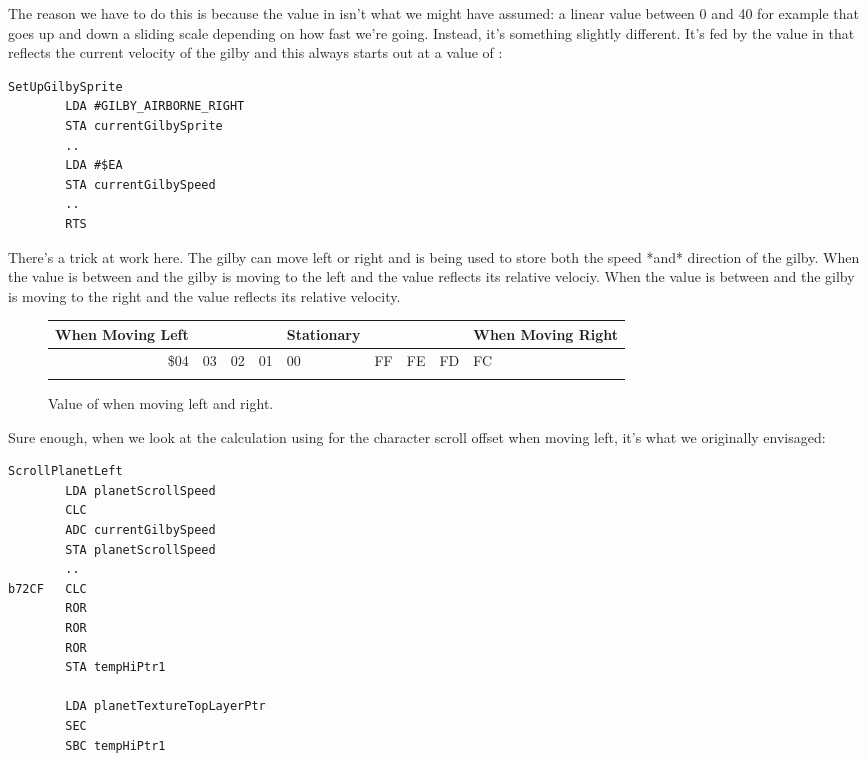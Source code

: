 The reason we have to do this is because the value in  isn't what we might have
assumed: a linear value between 0 and 40 for example that goes up and down a sliding scale depending on
how fast we're going. Instead, it's something slightly different. It's fed by the value in 
that reflects the current velocity of the gilby and this always starts out at a value of :

\begin{lstlisting}
SetUpGilbySprite
        LDA #GILBY_AIRBORNE_RIGHT
        STA currentGilbySprite
        ..
        LDA #$EA
        STA currentGilbySpeed
        ..
        RTS
\end{lstlisting}

There's a trick at work here. The gilby can move left or right and  is being used to
store both the speed *and* direction of the gilby. When the value is between  and  the gilby is moving
to the left and the value reflects its relative velociy. When the value is between  and  the gilby is
moving to the right and the value reflects its relative velocity.


\begin{figure}[H]
  {
    \setlength{\tabcolsep}{3.0pt}
    \setlength\cmidrulewidth{\heavyrulewidth} %
    \begin{adjustbox}{width=6cm,center}

      \begin{tabular}{rllllllll}
        \toprule
        When Moving Left &  & & & Stationary &  & & & When Moving Right    \\
        \midrule
        \$04 & 03 & 02 & 01 & 00 & FF & FE & FD & FC \\
        \addlinespace
        \bottomrule
      \end{tabular}
    \end{adjustbox}
  }\caption{Value of  when moving left and right.}
\end{figure}

Sure enough, when we look at the calculation using for the character scroll offset when moving left, it's what we
originally envisaged:

\begin{lstlisting}
ScrollPlanetLeft
        LDA planetScrollSpeed
        CLC
        ADC currentGilbySpeed
        STA planetScrollSpeed
        ..
b72CF   CLC
        ROR
        ROR
        ROR
        STA tempHiPtr1

        LDA planetTextureTopLayerPtr
        SEC
        SBC tempHiPtr1
\end{lstlisting}

